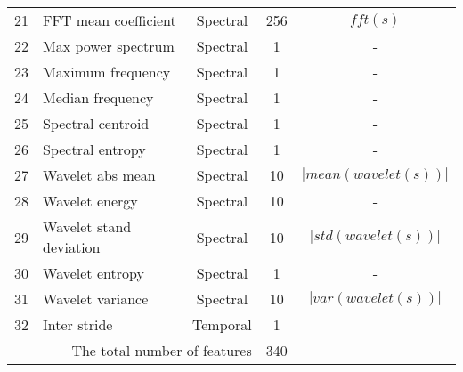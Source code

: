 {\begin{tabularx}{\linewidth}{@{}rlccc@{}}
  21 & FFT mean coefficient         & Spectral   & 256 & $fft(s)$ \\
  22 & Max power spectrum         & Spectral   & 1 & -\\%
  23 & Maximum frequency         & Spectral   & 1 & -\\
  24 & Median frequency         & Spectral   & 1 & -\\
  25 & Spectral centroid         & Spectral   & 1 & -\\
  26 & Spectral entropy         & Spectral   & 1 & -\\
  27 & Wavelet abs mean         & Spectral   & 10 & $|mean(wavelet(s))|$\\
  28 & Wavelet energy         & Spectral   & 10 & -\\%
  29 & Wavelet stand deviation         & Spectral   & 10& $|std(wavelet(s))|$\\
  30 & Wavelet entropy         & Spectral   & 1 & -\\%
  31 & Wavelet variance         & Spectral   & 10 & $|var(wavelet(s))|$\\ \hline
  32 & Inter stride         & Temporal   & 1\\ \hline
\multicolumn{3}{r}{The total number of features} & 340\\
\end{tabularx}\hspace*{-4cm}
}


